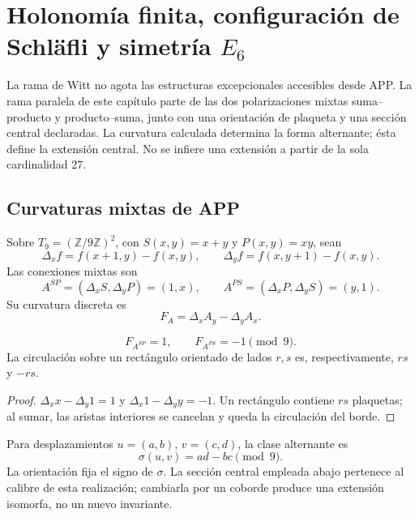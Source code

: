 \section{Holonomía finita, configuración de Schläfli y simetría \texorpdfstring{\(E_6\)}{E6}}
\label{x_reciprocidad:p12-83-c20-s6:chap:holonomia-schlafli-e6-nuevo}

La rama de Witt no agota las estructuras excepcionales accesibles desde
APP. La rama paralela de este capítulo parte de las dos polarizaciones
mixtas suma--producto y producto--suma, junto con una orientación de
plaqueta y una sección central declaradas. La curvatura calculada determina
la forma alternante; ésta define la extensión central. No se infiere una
extensión a partir de la sola cardinalidad 27.

\subsection{Curvaturas mixtas de APP}

Sobre \(T_9=(\mathbb Z/9\mathbb Z)^2\), con
\(S(x,y)=x+y\) y \(P(x,y)=xy\), sean
\[
 \Delta_xf=f(x+1,y)-f(x,y),\qquad
 \Delta_yf=f(x,y+1)-f(x,y).
\]
Las conexiones mixtas son
\[
 A^{SP}=(\Delta_xS,\Delta_yP)=(1,x),\qquad
 A^{PS}=(\Delta_xP,\Delta_yS)=(y,1).
\]
Su curvatura discreta es
\[
 F_A=\Delta_xA_y-\Delta_yA_x.
\]

\begin{proposition}
\label{x_reciprocidad:p12-83-c20-s6:prop:curvaturas-app-e6-nuevo}
\[
 F_{A^{SP}}=1,\qquad F_{A^{PS}}=-1\pmod9.
\]
La circulación sobre un rectángulo orientado de lados \(r,s\) es,
respectivamente, \(rs\) y \(-rs\).
\end{proposition}

\begin{proof}
\(\Delta_xx-\Delta_y1=1\) y
\(\Delta_x1-\Delta_yy=-1\). Un rectángulo contiene \(rs\) plaquetas; al
sumar, las aristas interiores se cancelan y queda la circulación del borde.
\end{proof}

Para desplazamientos \(u=(a,b)\), \(v=(c,d)\), la clase alternante es
\begin{equation}
 \sigma(u,v)=ad-bc\pmod9.
 \label{x_reciprocidad:p12-83-c20-s6:eq:forma-alternante-e6-nueva}
\end{equation}
La orientación fija el signo de \(\sigma\). La sección central empleada
abajo pertenece al calibre de esta realización; cambiarla por un coborde
produce una extensión isomorfa, no un nuevo invariante.

